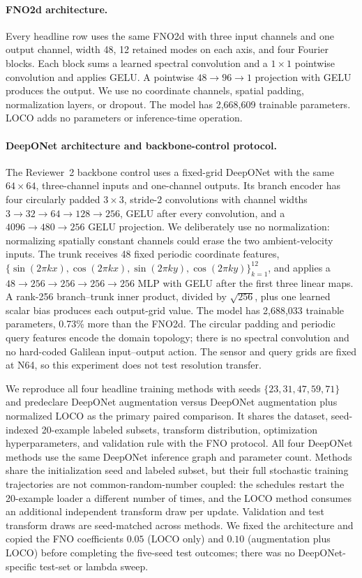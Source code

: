 \paragraph{FNO2d architecture.}
Every headline row uses the same FNO2d with three input channels and one output
channel, width 48, 12 retained modes on each axis, and four Fourier blocks.  Each
block sums a learned spectral convolution and a \(1\times1\) pointwise convolution
and applies GELU.  A pointwise \(48\to96\to1\) projection with GELU produces the
output.  We use no coordinate channels, spatial padding, normalization layers, or
dropout.  The model has 2,668,609 trainable parameters.  LOCO adds no parameters or
inference-time operation.

\paragraph{DeepONet architecture and backbone-control protocol.}
The Reviewer~2 backbone control uses a fixed-grid DeepONet with the same
\(64\times64\), three-channel inputs and one-channel outputs.  Its branch encoder
has four circularly padded \(3\times3\), stride-2 convolutions with channel widths
\(3\to32\to64\to128\to256\), GELU after every convolution, and a
\(4096\to480\to256\) GELU projection.  We deliberately use no normalization:
normalizing spatially constant channels could erase the two ambient-velocity
inputs.  The trunk receives 48 fixed periodic coordinate features,
\(\{\sin(2\pi kx),\cos(2\pi kx),\sin(2\pi ky),\cos(2\pi ky)\}_{k=1}^{12}\),
and applies a \(48\to256\to256\to256\to256\) MLP with GELU after the first
three linear maps.  A rank-256 branch--trunk inner product, divided by
\(\sqrt{256}\), plus one learned scalar bias produces each output-grid value.
The model has 2,688,033 trainable parameters, 0.73\% more than the FNO2d.  The
circular padding and periodic query features encode the domain topology; there
is no spectral convolution and no hard-coded Galilean input--output action.  The
sensor and query grids are fixed at N64, so this experiment does not test
resolution transfer.

We reproduce all four headline training methods with seeds
\(\{23,31,47,59,71\}\) and predeclare DeepONet augmentation versus DeepONet
augmentation plus normalized LOCO as the primary paired comparison.  It shares
the dataset, seed-indexed 20-example labeled subsets, transform distribution,
optimization hyperparameters, and validation rule with the FNO protocol.  All four
DeepONet methods use the same DeepONet inference graph and parameter count.  Methods
share the initialization seed and labeled subset, but their full stochastic training
trajectories are not common-random-number coupled: the schedules restart the
20-example loader a different number of times, and the LOCO method consumes an
additional independent transform draw per update.  Validation and test transform
draws are seed-matched across methods.  We fixed the
architecture and copied the FNO coefficients \(0.05\) (LOCO only) and \(0.10\)
(augmentation plus LOCO) before completing the five-seed test outcomes; there was
no DeepONet-specific test-set or lambda sweep.

